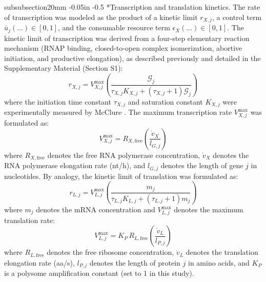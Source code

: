 \documentclass[12pt]{article}
\makeatletter
\renewcommand\subsubsection{\@startsection
	{subsubsection}{2}{0mm}
	{-0.05in}
	{-0.5\baselineskip}
	{\normalfont\normalsize\itshape}}
\makeatother
\begin{document}
\subsubsection*{Transcription and translation kinetics.}
The rate of transcription was modeled as the product of a kinetic limit $r_{X,j}$, a control term $\bar{u}_j(\dots) \in [0,1]$, and the consumable resource term $\epsilon_X(\dots) \in [0,1]$. The kinetic limit of transcription was derived from a four-step elementary reaction mechanism (RNAP binding, closed-to-open complex isomerization, abortive initiation, and productive elongation), as described previously \cite{adhikari2020effective} and detailed in the Supplementary Material (Section S1):
\begin{equation}
r_{X,j} = V_{X,j}^{\max}\left(\frac{\mathcal{G}_j}{\tau_{X,j}K_{X,j} + (\tau_{X,j}+1)\mathcal{G}_j}\right)
\end{equation}
where the initiation time constant $\tau_{X,j}$ and saturation constant $K_{X,j}$ were experimentally measured by McClure \cite{mcclure_1980}. The maximum transcription rate $V_{X,j}^{\max}$ was formulated as:
\begin{equation}
V_{X,j}^{\max} = R_{X,\text{free}}\left(\frac{\dot{v}_X}{l_{G,j}}\right)
\end{equation}
where $R_{X,\text{free}}$ denotes the free RNA polymerase concentration, $\dot{v}_X$ denotes the RNA polymerase elongation rate (nt/h), and $l_{G,j}$ denotes the length of gene $j$ in nucleotides. By analogy, the kinetic limit of translation was formulated as:
\begin{equation}
r_{L,j} = V_{L,j}^{\max}\left(\frac{m_j}{\tau_{L,j}K_{L,j} + (\tau_{L,j}+1)m_j}\right)
\end{equation}
where $m_j$ denotes the mRNA concentration and $V_{L,j}^{\max}$ denotes the maximum translation rate:
\begin{equation}
V_{L,j}^{\max} = K_P\,R_{L,\text{free}}\left(\frac{\dot{v}_L}{l_{P,j}}\right)
\end{equation}
where $R_{L,\text{free}}$ denotes the free ribosome concentration, $\dot{v}_L$ denotes the translation elongation rate (aa/s), $l_{P,j}$ denotes the length of protein $j$ in amino acids, and $K_P$ is a polysome amplification constant (set to 1 in this study).
\end{document}
